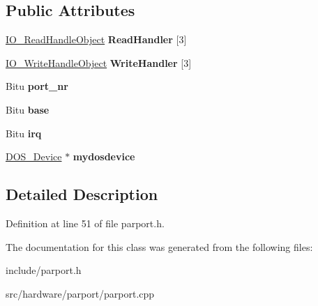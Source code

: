 \subsection*{Public Attributes}
\begin{DoxyCompactItemize}
\item 
\hypertarget{classCParallel_afb04319e90fc30254112b7552e2d45a3}{\hyperlink{classIO__ReadHandleObject}{I\-O\-\_\-\-Read\-Handle\-Object} {\bfseries Read\-Handler} \mbox{[}3\mbox{]}}\label{classCParallel_afb04319e90fc30254112b7552e2d45a3}

\item 
\hypertarget{classCParallel_acaf7de848aaf46f6b6b780264864cd9a}{\hyperlink{classIO__WriteHandleObject}{I\-O\-\_\-\-Write\-Handle\-Object} {\bfseries Write\-Handler} \mbox{[}3\mbox{]}}\label{classCParallel_acaf7de848aaf46f6b6b780264864cd9a}

\item 
\hypertarget{classCParallel_a5f04c351a88e683d6bb6f3e7185f7b36}{Bitu {\bfseries port\-\_\-nr}}\label{classCParallel_a5f04c351a88e683d6bb6f3e7185f7b36}

\item 
\hypertarget{classCParallel_a78326de3d93b2bf01aac0aa0d57b6b0f}{Bitu {\bfseries base}}\label{classCParallel_a78326de3d93b2bf01aac0aa0d57b6b0f}

\item 
\hypertarget{classCParallel_afebb5bfb64e0ec13cfb060ac02b8fb3c}{Bitu {\bfseries irq}}\label{classCParallel_afebb5bfb64e0ec13cfb060ac02b8fb3c}

\item 
\hypertarget{classCParallel_a4c49fe6eefcc72f5d47abdc2594e14f4}{\hyperlink{classDOS__Device}{D\-O\-S\-\_\-\-Device} $\ast$ {\bfseries mydosdevice}}\label{classCParallel_a4c49fe6eefcc72f5d47abdc2594e14f4}

\end{DoxyCompactItemize}


\subsection{Detailed Description}


Definition at line 51 of file parport.\-h.



The documentation for this class was generated from the following files\-:\begin{DoxyCompactItemize}
\item 
include/parport.\-h\item 
src/hardware/parport/parport.\-cpp\end{DoxyCompactItemize}
